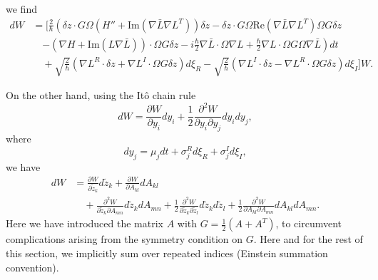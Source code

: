 \documentclass[12pt]{iopart} %
\begin{document}
we find
\begin{equation}
\begin{aligned} \label{eq:RHS}
		 dW &= \big[\tfrac{2}{\hbar} \left(\delta z \cdot G \Omega(H''+\text{Im}( \nabla \bar{L}\nabla{L}^{T})) \delta z  -\delta z \cdot G \Omega \text{Re}(\nabla \bar{L}  \nabla L^{T}) \Omega G \delta z	 \right.\\
		&\quad\left. -(\nabla H +\text{Im}(L\nabla \bar{L})) \cdot \Omega G \delta z -i \tfrac{\hbar}{2} \nabla \bar{L}\cdot \Omega \nabla L +\tfrac{\hbar}{2} \nabla L \cdot \Omega G\Omega \nabla \bar{L} \right)dt \\
		 &\quad +\sqrt{\tfrac{2}{ \hbar} }( \nabla L^R\cdot \delta z+\nabla L^I \cdot \Omega G \delta z) d\xi_R - \sqrt{\tfrac{2}{ \hbar} } ( \nabla L^I\cdot \delta z-\nabla L^R \cdot \Omega G \delta z) d\xi_I  \big]W. 
\end{aligned}
\end{equation}

On the other hand, using the It\^{o} chain rule \cite{bernt}
\begin{equation} \label{eq:itoChain}
	dW=\frac{\partial W}{\partial y_i}dy_i+\frac12\frac{\partial^2 W}{\partial y_i \partial y_j}dy_idy_j,
\end{equation}
where 
\begin{equation}
dy_j=\mu_j dt +\sigma_j^R d\xi_R +\sigma_j^I d\xi_I,
\end{equation}
we have
\begin{equation} 
\label{eqn:dWSSEIto}
	\begin{aligned}
	dW&=\frac{\partial W}{\partial \tilde{z}_k} d\tilde{z}_k+\frac{\partial W}{\partial A_{kl}} dA_{kl} \\
	&\quad+\frac{\partial^2 W}{\partial \tilde{z}_k\partial A_{mn}} d\tilde{z}_k dA_{mn}+\frac12\frac{\partial^2 W}{\partial \tilde{z}_k \partial \tilde{z}_l} d\tilde{z}_kd\tilde{z}_l+\frac12\frac{\partial^2 W}{\partial A_{kl}\partial A_{mn}} dA_{kl}dA_{mn}.
	\end{aligned}
\end{equation}
Here we have introduced the matrix $A$ with $G=\frac12(A+A^T)$, to circumvent complications arising from the symmetry condition on $G$. Here and for the rest of this section, we implicitly sum over repeated indices (Einstein summation convention). 
\end{document}
